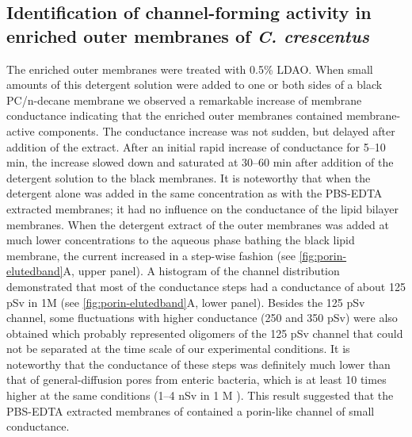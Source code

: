 \subsection{Identification of channel-forming activity in enriched outer membranes of \textit{C. crescentus}}
The enriched outer membranes were treated with 0.5\% \ac{LDAO}. When small amounts of this detergent solution were added to one or both sides of a black \ac{PC}/n-decane membrane we observed a remarkable increase of membrane conductance indicating that the enriched outer membranes contained membrane-active components. The conductance increase was not sudden, but delayed after addition of the extract. After an initial rapid increase of conductance for 5--10 min, the increase slowed down and saturated at 30--60 min after addition of the detergent solution to the black membranes. It is noteworthy that when the detergent alone was added in the same concentration as with the \ac{PBS}-\ac{EDTA} extracted membranes; it had no influence on the conductance of the lipid bilayer membranes. When the detergent extract of the outer membranes was added at much lower concentrations to the aqueous phase bathing the black lipid membrane, the current increased in a step-wise fashion (see \cref{fig:porin-elutedband}A, upper panel). A histogram of the channel distribution demonstrated that most of the conductance steps had a conductance of about 125 \si{\pico\sievert} in 1M  (see \cref{fig:porin-elutedband}A, lower panel). Besides the 125 \si{\pico\sievert} channel, some fluctuations with higher conductance (250 and 350 \si{\pico\sievert}) were also obtained which probably represented oligomers of the 125 \si{\pico\sievert} channel that could not be separated at the time scale of our experimental conditions. It is noteworthy that the conductance of these steps was definitely much lower than that of general-diffusion pores from enteric bacteria, which is at least 10 times higher at the same conditions (1--4 \si{\nano\sievert} in 1 M ). This result suggested that the \ac{PBS}-\ac{EDTA} extracted membranes of \caulobacter contained a porin-like channel of small conductance. 

